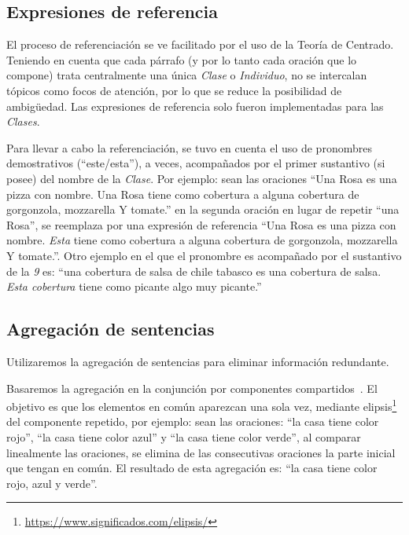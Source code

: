 \subsection{Expresiones de referencia}
El proceso de referenciación se ve facilitado por el uso de la Teoría de Centrado. 
Teniendo en cuenta que cada párrafo (y por lo tanto cada oración que lo compone) trata centralmente una única \textit{Clase }o \textit{Individuo}, no se intercalan tópicos como focos de atención, por lo que se reduce la posibilidad de ambigüedad. Las expresiones de referencia solo fueron implementadas para las \textit{Clases}.

Para llevar a cabo la referenciación, se tuvo en cuenta el uso de pronombres demostrativos (``este/esta''), a veces, acompañados por el primer sustantivo (si posee) del nombre de la \textit{Clase}. Por ejemplo: sean las oraciones ``Una Rosa es una pizza con nombre. Una Rosa tiene como cobertura a alguna cobertura de gorgonzola, mozzarella Y tomate.'' en la segunda oración en lugar de repetir ``una Rosa'', se reemplaza por una expresión de referencia ``Una Rosa es una pizza con nombre. \emph{Esta} tiene como cobertura a alguna cobertura de gorgonzola, mozzarella Y tomate.''. Otro ejemplo en el que el pronombre es acompañado por el sustantivo de la \textit{9 } es: ``una cobertura de salsa de chile tabasco es una cobertura de salsa. \emph{Esta cobertura} tiene como picante algo muy picante.''


\subsection{Agregación de sentencias}
Utilizaremos la agregación de sentencias para eliminar información redundante.

Basaremos la agregación en la conjunción por componentes compartidos~\cite{bernardos2003marco}. El objetivo es que los elementos en común aparezcan una sola vez, mediante elipsis\footnote{\url{https://www.significados.com/elipsis/}} del componente repetido, por ejemplo: sean las oraciones: ``la casa tiene color rojo'', ``la casa tiene color azul'' y ``la casa tiene color verde'', al comparar linealmente las oraciones, se elimina de las consecutivas oraciones la parte inicial que tengan en común. El resultado de esta agregación es: ``la casa tiene color rojo, azul y verde''.

